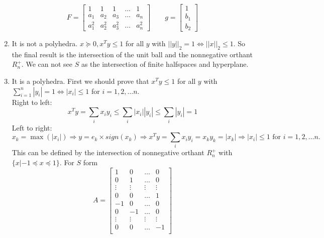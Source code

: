 \documentclass[a4paper]{article}
\begin{document}
\begin{latin}
\begin{enumerate}
	\begin{equation*}
		F = \begin{bmatrix} 
			1 & 1 & 1 & \dots & 1 \\
			a_{1} & a_{2} & a_{3} & \dots & a_{n} \\
			a_{1}^{2} & a_{2}^{2} & a_{3}^{2} & \dots & a_{n}^{2}
		\end{bmatrix}
		\qquad
		g = \begin{bmatrix} 
			1 \\
			b_{1}\\
			b_{2}
		\end{bmatrix}
	\end{equation*}
	\item It is not a polyhedra. $ x \succeq 0, x^{T} y \leq 1$ for all $ y $ with $ ||y||_{2} = 1  \Leftrightarrow ||x||_{2} \leq 1 $. So the final result is the intersection of the unit ball and the nonnegative orthant $ R_{n}^{+} $. We can not see $ S $ as the intersection of finite halfspaces and hyperplane.
	\item  It is a polyhedra. First we should prove that $ x^{T} y \leq 1$ for all $ y $ with $ \sum_{i=1}^{n} |y_{i}| = 1 \Leftrightarrow |x_{i}| \leq 1 $ for $ i = 1, 2, \dots n$.
	\\
	Right to left:
	\begin{equation*}
		x^T y = \sum_{i} x_{i} y_{i} \leq \sum_{i} |x_{i}| |y_{i}| \leq \sum_{i}  |y_{i}| = 1
	\end{equation*}
	Left to right:
	\begin{equation*}
		x_{k} = \max(|x_{i}|) \Rightarrow
		y = e_{k} \times sign(x_{k}) \Rightarrow x^T y = \sum_{i} x_{i} y_{i} = x_{k} y_{k} = |x_{k}| \Rightarrow |x_{i}| \leq 1 \text{ for } i = 1, 2, \dots n.
	\end{equation*}
	This can be defined by the intersection of nonnegative orthant $ R_{n}^{+} $ with $ \{x | -1 \preceq x \preceq 1\} $.  For $ S $ form
	\begin{equation*}
		A = \begin{bmatrix} 
			1 & 0 & \dots & 0\\
			0 & 1 & \dots & 0\\
			\vdots & \vdots & \vdots & \vdots \\
			0 & 0 & \dots & 1\\
			-1 & 0 & \dots & 0\\
			0 & -1 & \dots & 0\\
			\vdots & \vdots & \vdots & \vdots \\
			0 & 0 & \dots & -1\\

\end{bmatrix}
\end{equation*}
\end{enumerate}
\end{latin}
\end{document}
